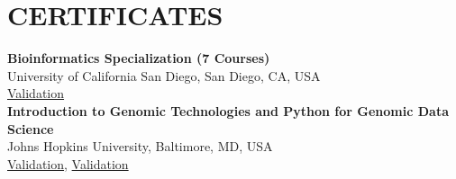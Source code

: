 \documentclass[a4paper,9pt]{extarticle}
\begin{document}

\section*{CERTIFICATES}

\noindent
\newline
\textbf{Bioinformatics Specialization (7 Courses)} \\
University of California San Diego, San Diego, CA, USA\\ \href{https://www.coursera.org/account/accomplishments/specialization/EV4TMKLBTG63}{Validation}\\

\noindent
\textbf{Introduction to Genomic Technologies and Python for Genomic Data Science} \\
Johns Hopkins University, Baltimore, MD, USA\\
\href{https://www.coursera.org/account/accomplishments/records/R52ZVQVWLBUG}{Validation}, \href{https://www.coursera.org/account/accomplishments/records/83F8LA8HLETP}{Validation}\\

\end{document}
